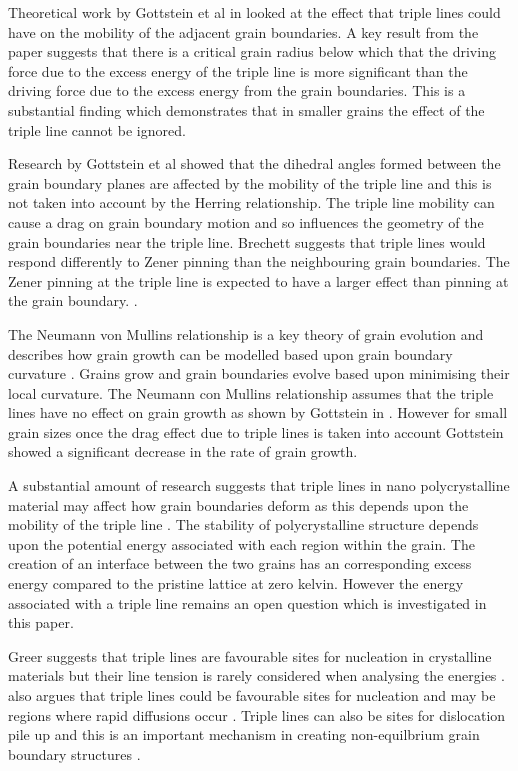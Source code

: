 \documentclass[12pt,a4paper]{book}
\begin{document}
Theoretical work by Gottstein et al in \cite{GOTTSTEIN2010914} looked at the effect that triple lines could have on the mobility of the adjacent grain boundaries. A key result from the paper suggests that there is a critical grain radius below which that the driving force due to the excess energy of the triple line is more significant than the driving force due to the excess energy from the grain boundaries. This is a substantial finding which demonstrates that in smaller grains the effect of the triple line cannot be ignored. 
 
Research by Gottstein et al \cite{GOTTSTEIN2010914} showed that the dihedral angles formed between the grain boundary planes are affected by the mobility of the triple line and this is not taken into account by the Herring relationship. The triple line mobility can cause a drag on grain boundary motion and so influences the geometry of the grain boundaries near the triple line. Brechett suggests that triple lines would respond differently to Zener pinning than the neighbouring grain boundaries. The Zener pinning at the triple line is expected to have a larger effect than pinning at the grain boundary. \cite{BRECHET2010910}.

The Neumann von Mullins relationship is a key theory of grain evolution and describes how grain growth can be modelled based upon grain boundary curvature \cite{Lazar2011}. Grains grow and grain boundaries evolve based upon minimising their local curvature. The Neumann con Mullins relationship assumes that the triple lines have no effect on grain growth as shown by Gottstein in \cite{GOTTSTEIN2010914}. However for small grain sizes once the drag effect due to triple lines is taken into account Gottstein showed a significant decrease in the rate of grain growth.

A substantial amount of research suggests that triple lines in nano polycrystalline material may affect how grain boundaries deform as this depends upon the mobility of the triple line \cite{BRECHET2010910,Shvindlerman2005, Fischer2012,
GOTTSTEIN2000, ZOLLNER201241, Miessen2015, Thomas2019}. The stability of polycrystalline structure depends upon the potential energy associated with each region within the grain. The creation of an interface between the two grains has an corresponding excess energy compared to the pristine lattice at zero kelvin. However the energy associated with a triple line remains an open question which is investigated in this paper.

Greer suggests that triple lines are favourable sites for nucleation in crystalline materials but their line tension is rarely considered when analysing the energies   \cite{GREER2010899}. \citeauthor{King2010} also argues that triple lines could be favourable sites for nucleation and may be   regions where rapid diffusions occur \cite{King2010}. Triple lines can also be sites for dislocation pile up and this is an important mechanism in creating non-equilbrium grain boundary structures \cite{Nazarov1993}. 
\end{document}
